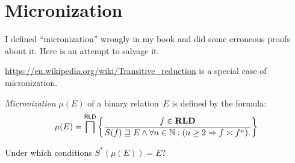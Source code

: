 \chapter{Micronization}

I defined ``micronization'' wrongly in my book and did some erroneous
proofs about it. Here is an attempt to salvage it.

\url{https://en.wikipedia.org/wiki/Transitive_reduction} is a special
case of micronization.

\begin{defn}
\emph{Micronization} $\mu(E)$ of a binary relation~$E$ is defined by
the formula:
\[
  \mu(E) = \bigsqcap^{\mathsf{RLD}} \left\{ \frac{f\in\mathbf{RLD}}{
    S(f)\sqsupseteq E \land \forall n\in\mathbb{N}:(n \geq 2\Rightarrow f\asymp f^n).
  }\right\}
\]
\end{defn}

\begin{question}
Under which conditions $S^\ast(\mu(E)) = E$?
\end{question}
